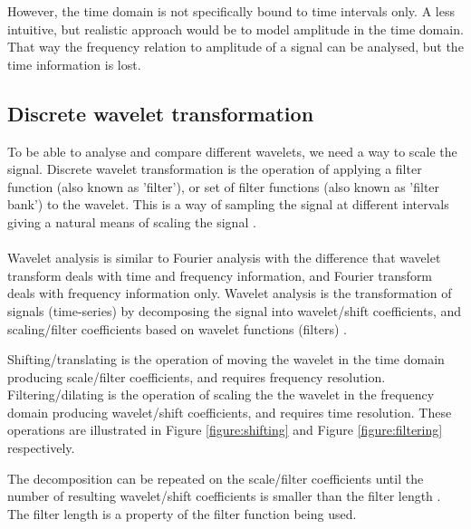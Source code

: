 However, the time domain is not specifically bound to time intervals only. A
less intuitive, but realistic approach would be to model amplitude in the time
domain. That way the frequency relation to amplitude of a signal can be
analysed, but the time information is lost.

\subsection{Discrete wavelet transformation}
To be able to analyse and compare different wavelets, we need a way to scale
the signal. Discrete wavelet transformation is the operation of applying a
filter function (also known as 'filter'), or set of filter functions (also known
as 'filter bank') to the wavelet. This is a way of sampling the signal at
different intervals giving a natural means of scaling the signal
\cite{karus2013}.

\paragraph{}
Wavelet analysis is similar to Fourier analysis with the difference that
wavelet transform deals with time and frequency information, and Fourier
transform deals with frequency information only. Wavelet analysis is the
transformation of signals (time-series) by decomposing the signal into
wavelet/shift coefficients, and scaling/filter coefficients based on wavelet
functions (filters) \cite{karus2013}.

Shifting/translating is the operation of moving the wavelet in the time
domain producing scale/filter coefficients, and requires frequency resolution.
Filtering/dilating is the operation of scaling the the wavelet in the frequency
domain producing wavelet/shift coefficients, and requires time resolution.
These operations are illustrated in Figure \ref{figure:shifting} and Figure
\ref{figure:filtering} respectively.

The decomposition can be repeated on the scale/filter coefficients until the
number of resulting wavelet/shift coefficients is smaller than the filter
length \cite{graps}. The filter length is a property of the filter function
being used.


\vspace{1em}



